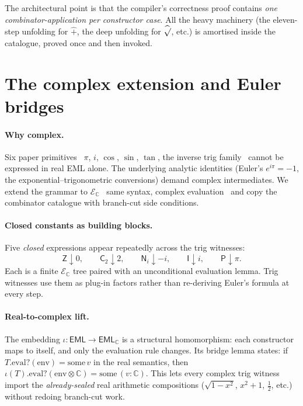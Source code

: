 \documentclass[11pt]{article}
\newcommand{\hsqrt}{\mathop{\widehat{\sqrt{\vphantom{x}}}}}
\newcommand{\hadd}{\mathbin{\widehat{+}}}
\newcommand{\EML}{\mathsf{EML}}
\newcommand{\EMLC}{\mathsf{EML}_{\mathbb{C}}}
\newcommand{\EsetC}{\mathcal{E}_{\mathbb{C}}}
\theoremstyle{plain}
\theoremstyle{definition}
\begin{document}
The architectural point is that the compiler's correctness proof
contains \emph{one combinator-application per constructor case}. All
the heavy machinery (the eleven-step unfolding for $\hadd$, the deep
unfolding for $\hsqrt$, etc.) is amortised inside the catalogue,
proved once and then invoked.

\section{The complex extension and Euler bridges}
\label{sec:euler}

\paragraph{Why complex.}
Six paper primitives \textemdash\ $\pi$, $i$, $\cos$, $\sin$, $\tan$,
the inverse trig family \textemdash\ cannot be expressed in real EML alone.
The underlying analytic identities (Euler's $e^{i\pi} = -1$, the
exponential--trigonometric conversions) demand complex intermediates.
We extend the grammar to $\EsetC$ \textemdash\ same syntax, complex
evaluation \textemdash\ and copy the combinator catalogue with branch-cut
side conditions.

\paragraph{Closed constants as building blocks.}
Five \emph{closed} expressions appear repeatedly across the trig
witnesses:
\[
  \mathsf{Z} \downarrow 0,\qquad
  \mathsf{C}_2 \downarrow 2,\qquad
  \mathsf{N}_i \downarrow -i,\qquad
  \mathsf{I} \downarrow i,\qquad
  \mathsf{P} \downarrow \pi.
\]
Each is a finite $\EsetC$ tree paired with an unconditional evaluation
lemma. Trig witnesses use them as plug-in factors rather than
re-deriving Euler's formula at every step.

\paragraph{Real-to-complex lift.}
The embedding $\iota : \EML \to \EMLC$ is a structural homomorphism:
each constructor maps to itself, and only the evaluation rule changes.
Its bridge lemma states: if $T.\mathrm{eval?}(\mathrm{env}) =
\mathrm{some}\,v$ in the real semantics, then
$\iota(T).\mathrm{eval?}(\mathrm{env}\!\otimes\!\mathbb{C}) =
\mathrm{some}\,(v : \mathbb{C})$. This lets every complex trig witness
import the \emph{already-sealed} real arithmetic compositions
($\sqrt{1-x^2}$, $x^2 + 1$, $\tfrac{1}{2}$, etc.) without redoing
branch-cut work.
\end{document}
